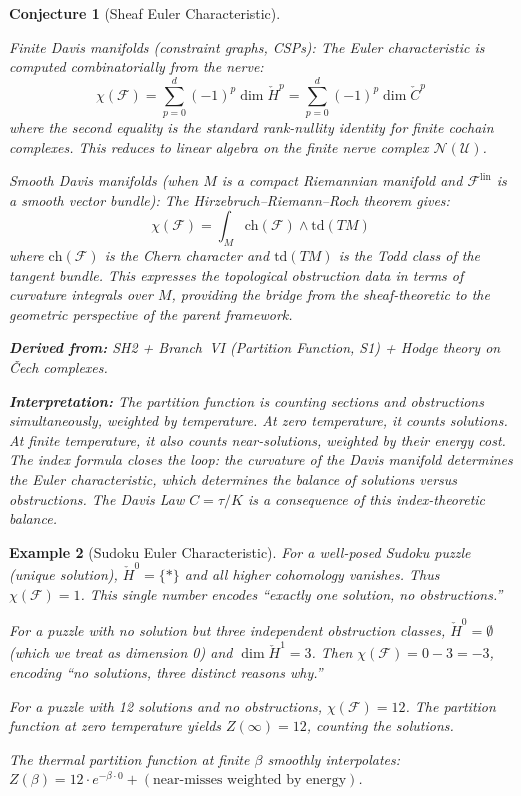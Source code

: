 \documentclass[11pt,letterpaper]{article}
\newtheorem{conjecture}{Conjecture}[section]
\newtheorem{example}[conjecture]{Example}
\newcommand{\Cech}{\check{C}}
\newcommand{\Hcech}{\check{H}}
\newcommand{\sheaf}{\mathcal{F}}
\newcommand{\cover}{\mathcal{U}}
\newcommand{\nerve}{\mathcal{N}}
\begin{document}
\begin{conjecture}[Sheaf Euler Characteristic]
\begin{enumerate}[label=(\alph*)]
    \emph{Finite Davis manifolds} (constraint graphs, CSPs): The 
    Euler characteristic is computed combinatorially from the nerve:
    \begin{equation}\label{eq:index_finite}
        \chi(\sheaf) = \sum_{p=0}^{d} (-1)^p \dim \Hcech^p 
        = \sum_{p=0}^{d} (-1)^p \dim \Cech^p
    \end{equation}
    where the second equality is the standard rank-nullity identity 
    for finite cochain complexes. This reduces to linear algebra on 
    the finite nerve complex $\nerve(\cover)$.
    
    \emph{Smooth Davis manifolds} (when $M$ is a compact Riemannian 
    manifold and $\sheaf^{\mathrm{lin}}$ is a smooth vector bundle): 
    The Hirzebruch--Riemann--Roch theorem gives:
    \begin{equation}\label{eq:index}
        \chi(\sheaf) = \int_M \mathrm{ch}(\sheaf) \wedge 
        \mathrm{td}(TM)
    \end{equation}
    where $\mathrm{ch}(\sheaf)$ is the Chern character and 
    $\mathrm{td}(TM)$ is the Todd class of the tangent bundle. This 
    expresses the topological obstruction data in terms of 
    \emph{curvature integrals} over $M$, providing the bridge from 
    the sheaf-theoretic to the geometric perspective of the parent 
    framework.
\end{enumerate}

\textbf{Derived from:} SH2 + Branch~VI (Partition Function, S1) + 
Hodge theory on \v{C}ech complexes.

\textbf{Interpretation:} The partition function is counting sections 
and obstructions simultaneously, weighted by temperature. At zero 
temperature, it counts solutions. At finite temperature, it also 
counts near-solutions, weighted by their energy cost. The index formula 
closes the loop: the \emph{curvature} of the Davis manifold determines 
the Euler characteristic, which determines the balance of solutions 
versus obstructions. The Davis Law $C = \tau / K$ is a 
\emph{consequence} of this index-theoretic balance.
\end{conjecture}

\begin{example}[Sudoku Euler Characteristic]
For a well-posed Sudoku puzzle (unique solution), $\Hcech^0 = \{*\}$ 
and all higher cohomology vanishes. Thus $\chi(\sheaf) = 1$. This 
single number encodes ``exactly one solution, no obstructions.''

For a puzzle with no solution but three independent obstruction classes, 
$\Hcech^0 = \emptyset$ (which we treat as dimension 0) and 
$\dim \Hcech^1 = 3$. Then $\chi(\sheaf) = 0 - 3 = -3$, encoding 
``no solutions, three distinct reasons why.''

For a puzzle with 12 solutions and no obstructions, $\chi(\sheaf) = 
12$. The partition function at zero temperature yields 
$Z(\infty) = 12$, counting the solutions.

The thermal partition function at finite $\beta$ smoothly interpolates: 
$Z(\beta) = 12 \cdot e^{-\beta \cdot 0} + 
(\text{near-misses weighted by energy})$.
\end{example}
\end{document}

